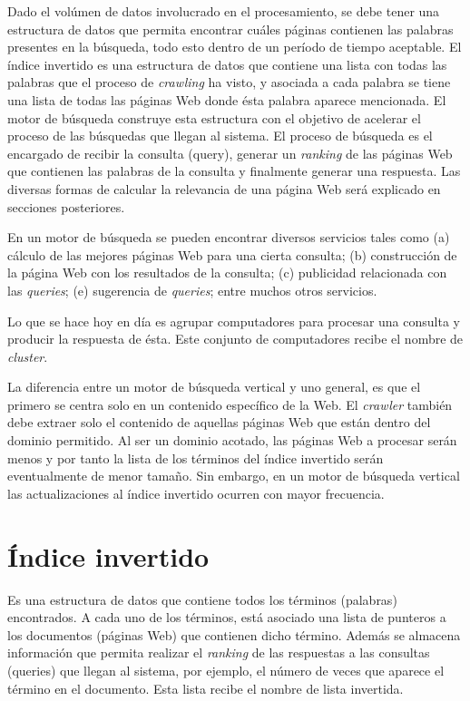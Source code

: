 Dado el volúmen de datos involucrado en el procesamiento, se debe tener una estructura de datos que permita encontrar cuáles páginas contienen las palabras presentes en la búsqueda, todo esto dentro de un período de tiempo aceptable. El índice invertido es una estructura de datos que contiene una lista con todas las palabras que el proceso de \textit{crawling} ha visto, y asociada a cada palabra se tiene una lista de todas las páginas Web donde ésta palabra aparece mencionada. El motor de búsqueda construye esta estructura con el objetivo de acelerar el proceso de las búsquedas que llegan al sistema. El proceso de búsqueda es el encargado de recibir la consulta (query), generar un \textit{ranking} de las páginas Web que contienen las palabras de la consulta y finalmente generar una respuesta. Las diversas formas de calcular la relevancia de una página Web será explicado en secciones posteriores.

En un motor de búsqueda se pueden encontrar diversos servicios tales como (a) cálculo de las mejores páginas Web para una cierta consulta; (b) construcción de la página Web con los resultados de la consulta; (c) publicidad relacionada con las \textit{queries}; (e) sugerencia de \textit{queries}; entre muchos otros servicios.

Lo que se hace hoy en día es agrupar computadores para procesar una consulta y producir la respuesta de ésta. Este conjunto de computadores recibe el nombre de \textit{cluster}.

La diferencia entre un motor de búsqueda vertical y uno general, es que el primero se centra solo en un contenido específico de la Web. El \textit{crawler} también debe extraer solo el contenido de aquellas páginas Web que están dentro del dominio permitido. Al ser un dominio acotado, las páginas Web a procesar serán menos y por tanto la lista de los términos del índice invertido serán eventualmente de menor tamaño. Sin embargo, en un motor de búsqueda vertical las actualizaciones al índice invertido ocurren con mayor frecuencia.

\section{\'Indice invertido}
\label{marco:ii}
Es una estructura de datos que contiene todos los términos (palabras) encontrados. A cada uno de los términos, está asociado una lista de punteros a los documentos (páginas Web) que contienen dicho término. Además se almacena información que permita realizar el \textit{ranking} de las respuestas a las consultas (queries) que llegan al sistema, por ejemplo, el número de veces que aparece el término en el documento. Esta lista recibe el nombre de lista invertida.

